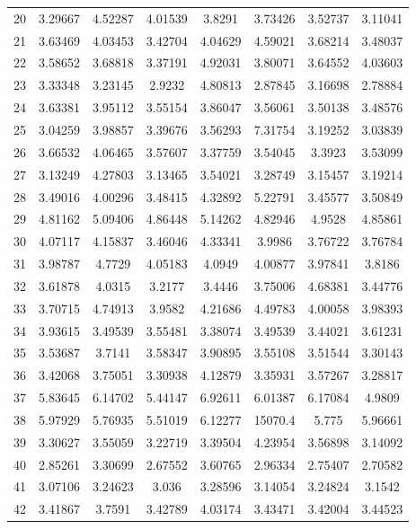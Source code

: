 \begin{figure}
\begin{tabular}{cccccccc}
20 & 3.29667 & 4.52287 & 4.01539 & 3.8291 & 3.73426 & 3.52737 & 3.11041\\
21 & 3.63469 & 4.03453 & 3.42704 & 4.04629 & 4.59021 & 3.68214 & 3.48037\\
22 & 3.58652 & 3.68818 & 3.37191 & 4.92031 & 3.80071 & 3.64552 & 4.03603\\
23 & 3.33348 & 3.23145 & 2.9232 & 4.80813 & 2.87845 & 3.16698 & 2.78884\\
24 & 3.63381 & 3.95112 & 3.55154 & 3.86047 & 3.56061 & 3.50138 & 3.48576\\
25 & 3.04259 & 3.98857 & 3.39676 & 3.56293 & 7.31754 & 3.19252 & 3.03839\\
26 & 3.66532 & 4.06465 & 3.57607 & 3.37759 & 3.54045 & 3.3923 & 3.53099\\
27 & 3.13249 & 4.27803 & 3.13465 & 3.54021 & 3.28749 & 3.15457 & 3.19214\\
28 & 3.49016 & 4.00296 & 3.48415 & 4.32892 & 5.22791 & 3.45577 & 3.50849\\
29 & 4.81162 & 5.09406 & 4.86448 & 5.14262 & 4.82946 & 4.9528 & 4.85861\\
30 & 4.07117 & 4.15837 & 3.46046 & 4.33341 & 3.9986 & 3.76722 & 3.76784\\
31 & 3.98787 & 4.7729 & 4.05183 & 4.0949 & 4.00877 & 3.97841 & 3.8186\\
32 & 3.61878 & 4.0315 & 3.2177 & 3.4446 & 3.75006 & 4.68381 & 3.44776\\
33 & 3.70715 & 4.74913 & 3.9582 & 4.21686 & 4.49783 & 4.00058 & 3.98393\\
34 & 3.93615 & 3.49539 & 3.55481 & 3.38074 & 3.49539 & 3.44021 & 3.61231\\
35 & 3.53687 & 3.7141 & 3.58347 & 3.90895 & 3.55108 & 3.51544 & 3.30143\\
36 & 3.42068 & 3.75051 & 3.30938 & 4.12879 & 3.35931 & 3.57267 & 3.28817\\
37 & 5.83645 & 6.14702 & 5.44147 & 6.92611 & 6.01387 & 6.17084 & 4.9809\\
38 & 5.97929 & 5.76935 & 5.51019 & 6.12277 & 15070.4 & 5.775 & 5.96661\\
39 & 3.30627 & 3.55059 & 3.22719 & 3.39504 & 4.23954 & 3.56898 & 3.14092\\
40 & 2.85261 & 3.30699 & 2.67552 & 3.60765 & 2.96334 & 2.75407 & 2.70582\\
41 & 3.07106 & 3.24623 & 3.036 & 3.28596 & 3.14054 & 3.24824 & 3.1542\\
42 & 3.41867 & 3.7591 & 3.42789 & 4.03174 & 3.43471 & 3.42004 & 3.44523\\

\end{tabular}
\end{figure}
